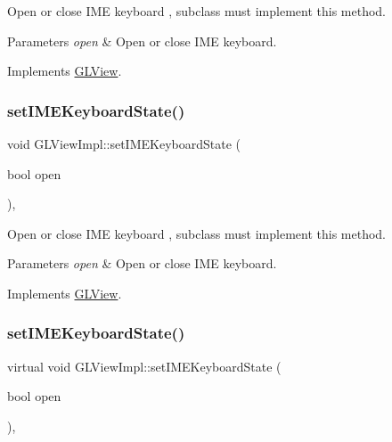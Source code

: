Open or close I\+ME keyboard , subclass must implement this method.


\begin{DoxyParams}{Parameters}
{\em open} & Open or close I\+ME keyboard. \\
\hline
\end{DoxyParams}


Implements \hyperlink{classGLView_aaa70edad9dd4b2052237867db978e06d}{G\+L\+View}.

\mbox{\label{classGLViewImpl_a134389b64b11ebd0af740c9acba58dc9}} 
\subsubsection{\texorpdfstring{set\+I\+M\+E\+Keyboard\+State()}{setIMEKeyboardState()}\hspace{0.1cm}{\footnotesize\ttfamily [3/9]}}
{\footnotesize\ttfamily void G\+L\+View\+Impl\+::set\+I\+M\+E\+Keyboard\+State (\begin{DoxyParamCaption}\item[{bool}]{open }\end{DoxyParamCaption})\hspace{0.3cm}{\ttfamily [override]}, {\ttfamily [virtual]}}

Open or close I\+ME keyboard , subclass must implement this method.


\begin{DoxyParams}{Parameters}
{\em open} & Open or close I\+ME keyboard. \\
\hline
\end{DoxyParams}


Implements \hyperlink{classGLView_aaa70edad9dd4b2052237867db978e06d}{G\+L\+View}.

\mbox{\label{classGLViewImpl_a37e04acaf52f6258ebe98d6b36c3b6c3}} 
\subsubsection{\texorpdfstring{set\+I\+M\+E\+Keyboard\+State()}{setIMEKeyboardState()}\hspace{0.1cm}{\footnotesize\ttfamily [4/9]}}
{\footnotesize\ttfamily virtual void G\+L\+View\+Impl\+::set\+I\+M\+E\+Keyboard\+State (\begin{DoxyParamCaption}\item[{bool}]{open }\end{DoxyParamCaption})\hspace{0.3cm}{\ttfamily [override]}, {\ttfamily [virtual]}}

